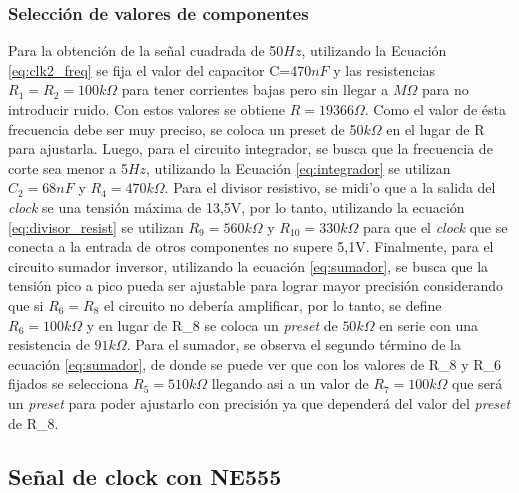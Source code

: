 \documentclass[11pt, a4paper]{article}
\begin{document}
\subsubsection{Selecci\'on de valores de componentes}
\noindent
Para la obtenci\'on de la señal cuadrada de 50$Hz$, utilizando la Ecuaci\'on \ref{eq:clk2_freq} se fija el valor del capacitor C=470$nF$ y las resistencias $R_1=R_2=100k\Omega$ para tener corrientes bajas pero sin llegar a $M\Omega$ para no introducir ruido. Con estos valores se obtiene $R=19366\Omega$. Como el valor de \'esta frecuencia debe ser muy preciso, se coloca un preset de 50$k\Omega$ en el lugar de R para ajustarla.\newline
Luego, para el circuito integrador, se busca que la frecuencia de corte sea menor a 5$Hz$, utilizando la Ecuaci\'on \ref{eq:integrador} se utilizan $C_2=68nF$ y $R_4 = 470k\Omega$.
Para el divisor resistivo, se midi'o que a la salida del \textit{clock} se una tensi\'on m\'axima de 13,5V, por lo tanto, utilizando la ecuaci\'on \ref{eq:divisor_resist} se utilizan $R_9=560k\Omega$ y $R_{10}=330k\Omega$ para que el \textit{clock} que se conecta a la entrada de otros componentes no supere 5,1V.\newline
Finalmente, para el circuito sumador inversor, utilizando la ecuaci\'on \ref{eq:sumador}, se busca que la tensi\'on pico a pico pueda ser ajustable para lograr mayor precisi\'on considerando que si $R_6=R_8$ el circuito no deber\'ia amplificar, por lo tanto, se define $R_6=100k\Omega$ y en lugar de R_8 se coloca un \textit{preset} de $50k\Omega$ en serie con una resistencia de $91k\Omega$.
Para el sumador,  se observa el segundo t\'ermino de la ecuaci\'on \ref{eq:sumador}, de donde se puede ver que con los valores de R_8 y R_6 fijados se selecciona $R_5=510k\Omega$ llegando asi a un valor de $R_7 = 100k\Omega$ que ser\'a un \textit{preset} para poder ajustarlo con precisi\'on ya que depender\'a del valor del \textit{preset} de R_8.
%
\subsection{Señal de clock con NE555}
%
\end{document}
